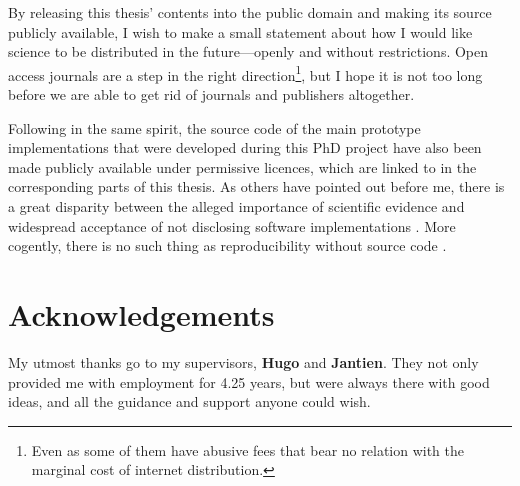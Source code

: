 By releasing this thesis' contents into the public domain and making its source publicly available, I wish to make a small statement about how I would like science to be distributed in the future---openly and without restrictions.
Open access journals are a step in the right direction\footnote{Even as some of them have abusive fees that bear no relation with the marginal cost of internet distribution.}, but I hope it is not too long before we are able to get rid of journals and publishers altogether.

Following in the same spirit, the source code of the main prototype implementations that were developed during this PhD project have also been made publicly available under permissive licences, which are linked to in the corresponding parts of this thesis.
As others have pointed out before me, there is a great disparity between the alleged importance of scientific evidence and widespread acceptance of not disclosing software implementations \citep{Morin12,Joppa13}.
More cogently, there is no such thing as reproducibility without source code \citep{Ince12}.





\section*{Acknowledgements}

My utmost thanks go to my supervisors, \textbf{Hugo} and \textbf{Jantien}.
They not only provided me with employment for 4.25 years, but were always there with good ideas, and all the guidance and support anyone could wish.

